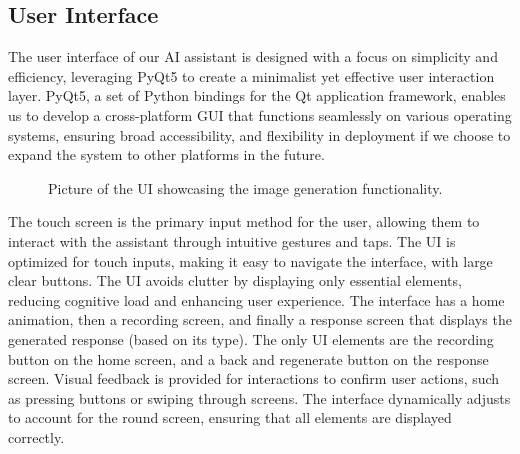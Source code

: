 \documentclass[12pt]{article}
\begin{document}
\subsection{User Interface}
The user interface of our AI assistant is designed with a focus on simplicity and efficiency, leveraging PyQt5 to create a minimalist yet effective user interaction layer. PyQt5, a set of Python bindings for the Qt application framework, enables us to develop a cross-platform GUI that functions seamlessly on various operating systems, ensuring broad accessibility, and flexibility in deployment if we choose to expand the system to other platforms in the future. 
\begin{figure}[bht]
	\begin{center}
	{} 
	\end{center}
	\vspace{-5mm} %
	\caption{Picture of the UI showcasing the image generation functionality.}
	\label{device}
\end{figure}

The touch screen is the primary input method for the user, allowing them to interact with the assistant through intuitive gestures and taps.
The UI is optimized for touch inputs, making it easy to navigate the interface, with large clear buttons. The UI avoids clutter by displaying only essential elements, reducing cognitive load and enhancing user experience. The interface has a home animation, then a recording screen, and finally a response screen that displays the generated response (based on its type). The only UI elements are the recording button on the home screen, and a back and regenerate button on the response screen. 
Visual feedback is provided for interactions to confirm user actions, such as pressing buttons or swiping through screens.
The interface dynamically adjusts to account for the round screen, ensuring that all elements are displayed correctly.
\end{document}
